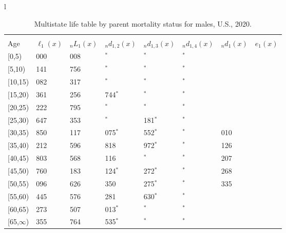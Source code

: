 \documentclass[
]{article}
\begin{document}
\begin{table}
\caption{\label{tab:table-male}Multistate life table by parent mortality status for males, U.S., 2020.}

\centering
\fontsize{9}{11}\selectfont
\begin{tabular}[t]{l}
\hline
\begin{tabular}{>{\raggedright\arraybackslash}p{.45in}>{\raggedleft\arraybackslash}p{.65in}>{\raggedleft\arraybackslash}p{.65in}>{\raggedleft\arraybackslash}p{.65in}>{\raggedleft\arraybackslash}p{.65in}>{\raggedleft\arraybackslash}p{.65in}>{\raggedleft\arraybackslash}p{.65in}>{\raggedleft\arraybackslash}p{.65in}}
\toprule
\multicolumn{1}{c}{ } & \multicolumn{7}{c}{(1) Lost neither} \\
\cmidrule(l{3pt}r{3pt}){2-8}
Age & $\ell_{1}(x)$ & ${}_nL_{1}(x)$ & ${}_nd_{1,2}(x)$ & ${}_nd_{1,3}(x)$ & ${}_nd_{1,4}(x)$ & ${}_nd_{1}(x)$ & $e_{1}(x)$\\
\midrule
{}[0,5) & 100 000 & 495 008 & 175$^{*}$ & 0$^{*}$ & 0$^{*}$ & 684 & 46\\
{}[5,10) & 99 141 & 490 756 & 0$^{*}$ & 0$^{*}$ & 0$^{*}$ & 59 & 41\\
{}[10,15) & 99 082 & 483 317 & 625$^{*}$ & 0$^{*}$ & 0$^{*}$ & 96 & 36\\
{}[15,20) & 98 361 & 472 256 & 1 744$^{*}$ & 0$^{*}$ & 0$^{*}$ & 395 & 31\\
{}[20,25) & 96 222 & 469 795 & 678$^{*}$ & 151$^{*}$ & 0$^{*}$ & 745 & 27\\
\addlinespace
{}[25,30) & 94 647 & 440 353 & 744$^{*}$ & 1 181$^{*}$ & 0$^{*}$ & 873 & 22\\
{}[30,35) & 91 850 & 413 117 & 3 075$^{*}$ & 1 552$^{*}$ & 0$^{*}$ & 1 010 & 18\\
{}[35,40) & 86 212 & 383 596 & 4 818 & 2 972$^{*}$ & 494$^{*}$ & 1 126 & 14\\
{}[40,45) & 76 803 & 334 568 & 4 116 & 721$^{*}$ & 0$^{*}$ & 1 207 & 10\\
{}[45,50) & 70 760 & 260 183 & 3 124$^{*}$ & 2 272$^{*}$ & 0$^{*}$ & 1 268 & 6\\
\addlinespace
{}[50,55) & 64 096 & 187 626 & 4 350 & 1 275$^{*}$ & 691$^{*}$ & 1 335 & 4\\
{}[55,60) & 56 445 & 87 576 & 4 281 & 1 630$^{*}$ & 316$^{*}$ & 945 & 2\\
{}[60,65) & 49 273 & 40 507 & 1 013$^{*}$ & 841$^{*}$ & 424$^{*}$ & 640 & 1\\
{}[65,$\infty$) & 46 355 & 10 764 & 2 535$^{*}$ & 285$^{*}$ & 611$^{*}$ & 632 & 0\\

\end{tabular}
\end{tabular}
\end{table}
\end{document}
